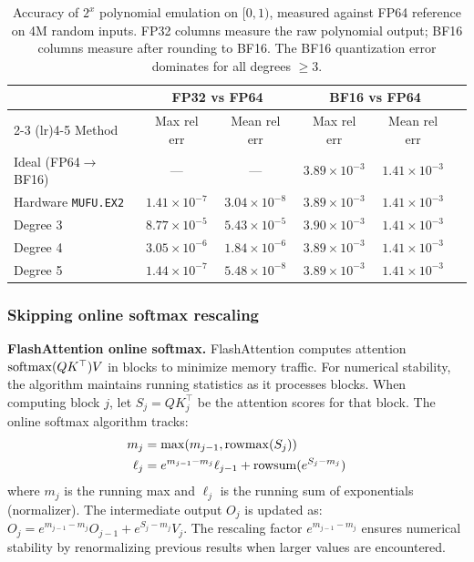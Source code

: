 \begin{table}[t]
\centering
\small
\begin{tabular}{lccccc}
\toprule
& \multicolumn{2}{c}{FP32 vs FP64} & \multicolumn{2}{c}{BF16 vs FP64} \\
\cmidrule(lr){2-3} \cmidrule(lr){4-5}
Method & Max rel err & Mean rel err & Max rel err & Mean rel err \\
\midrule
Ideal (FP64$\to$BF16) & --- & --- & $3.89 \times 10^{-3}$ & $1.41 \times 10^{-3}$ \\
Hardware \texttt{MUFU.EX2} & $1.41 \times 10^{-7}$ & $3.04 \times 10^{-8}$ & $3.89 \times 10^{-3}$ & $1.41 \times 10^{-3}$ \\
Degree 3 & $8.77 \times 10^{-5}$ & $5.43 \times 10^{-5}$ & $3.90 \times 10^{-3}$ & $1.41 \times 10^{-3}$ \\
Degree 4 & $3.05 \times 10^{-6}$ & $1.84 \times 10^{-6}$ & $3.89 \times 10^{-3}$ & $1.41 \times 10^{-3}$ \\
Degree 5 & $1.44 \times 10^{-7}$ & $5.48 \times 10^{-8}$ & $3.89 \times 10^{-3}$ & $1.41 \times 10^{-3}$ \\
\bottomrule
\end{tabular}
\caption{Accuracy of $2^x$ polynomial emulation on $[0, 1)$, measured against FP64 reference on 4M random inputs. FP32 columns measure the raw polynomial output; BF16 columns measure after rounding to BF16. The BF16 quantization error dominates for all degrees $\geq 3$.}
\label{tab:ex2_accuracy}
\end{table}


\subsubsection{Skipping online softmax rescaling}

\textbf{FlashAttention online softmax.}
FlashAttention computes attention $\mathrm{softmax}(QK^\top)V$ in blocks to minimize memory traffic. For numerical stability, the algorithm maintains running statistics as it processes blocks. When computing block $j$, let $S_j = Q K_j^\top$ be the attention scores for that block. The online softmax algorithm tracks:
\begin{align*}
m_j &= \mathrm{max}(m_{j-1}, \mathrm{rowmax}(S_j)) \\
\ell_j &= e^{m_{j-1} - m_j} \ell_{j-1} + \mathrm{rowsum}(e^{S_j - m_j})
\end{align*}
where $m_j$ is the running max and $\ell_j$ is the running sum of exponentials (normalizer). The intermediate output $O_j$ is updated as:
$
O_j = e^{m_{j-1} - m_j} O_{j-1} + e^{S_j - m_j} V_j.
$
The rescaling factor $e^{m_{j-1} - m_j}$ ensures numerical stability by renormalizing previous results when larger values are encountered.

